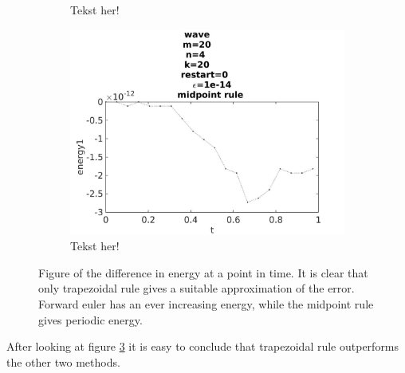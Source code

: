 \begin{figure}[H]
\begin{subfigure}[b]{0.30\textwidth}
                \caption{ Tekst her! }
                \label{fig:errorb}
        \end{subfigure}
        \begin{subfigure}[b]{0.30\textwidth}
                \includegraphics[width=\textwidth]{../MATLAB/fig/energyovertimemidpoint.jpg}
                \caption{ Tekst her! }
                \label{fig:errorb}
        \end{subfigure}
        \caption{Figure of the difference in energy at a point in time. It is clear that only trapezoidal rule gives a suitable approximation of the error. Forward euler has an ever increasing energy, while the midpoint rule gives periodic energy. }
        \label{fig:energy}
\end{figure}
After looking at figure \ref{fig:energy} it is easy to conclude that trapezoidal rule outperforms the other two methods.